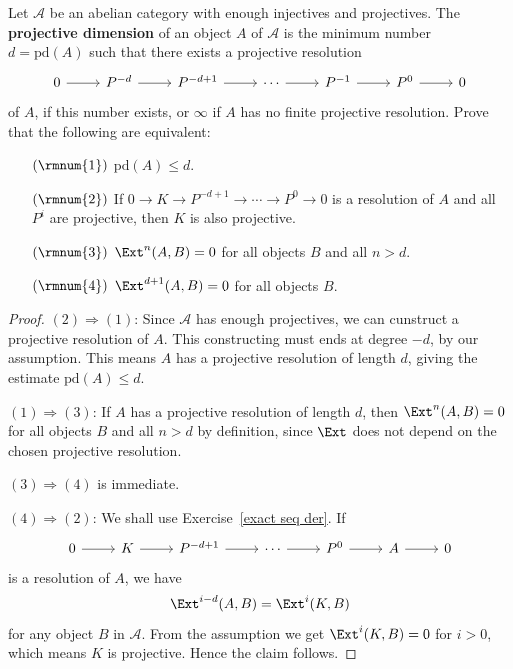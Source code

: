 \begin{exercise}
Let $\mathcal{A}$ be an abelian category with enough injectives and projectives. The \textbf{projective dimension} of an object $A$ of $\mathcal{A}$ is the minimum number $d=\mathrm{pd}(A)$ such that there exists a projective resolution
\[\begin{tikzcd}
0\ar[r]&P^{-d}\ar[r]&P^{-d+1}\ar[r]&\cdots\ar[r]&P^{-1}\ar[r]&P^0\ar[r]&0
\end{tikzcd}\]
of $A$, if this number exists, or $\infty$ if $A$ has no finite projective resolution. Prove that the following are equivalent:
\begin{itemize}
\item[$(\rmnum{1})$] $\mathrm{pd}(A)\leqslant d$.
\item[$(\rmnum{2})$] If $0\to K\to P^{-d+1}\to\cdots\to P^0\to 0$ is a resolution of $A$ and all $P^i$ are
projective, then $K$ is also projective.
\item[$(\rmnum{3})$] $\Ext^n(A,B)=0$ for all objects $B$ and all $n>d$.
\item[$(\rmnum{4})$] $\Ext^{d+1}(A,B)=0$ for all objects $B$.
\end{itemize}
\end{exercise}
\begin{proof}
$(2)\Rightarrow(1)$: Since $\mathcal{A}$ has enough projectives, we can cunstruct a projective resolution of $A$. This constructing must ends at degree $-d$, by our assumption. This means $A$ has a projective resolution of length $d$, giving the estimate $\mathrm{pd}(A)\leqslant d$.\par
$(1)\Rightarrow(3)$: If $A$ has a projective resolution of length $d$, then $\Ext^n(A,B)=0$ for all objects $B$ and all $n>d$ by definition, since $\Ext$ does not depend on the chosen projective resolution.\par
$(3)\Rightarrow(4)$ is immediate.\par
$(4)\Rightarrow(2)$: We shall use Exercise~\ref{exact seq der}. If
\[\begin{tikzcd}
0\ar[r]&K\ar[r]&P^{-d+1}\ar[r]&\cdots\ar[r]&P^0\ar[r]&A\ar[r]&0
\end{tikzcd}\]
is a resolution of $A$, we have
\[\Ext^{i-d}(A,B)=\Ext^i(K,B)\]
for any object $B$ in $\mathcal{A}$. From the assumption we get $\Ext^i(K,B)=0$ for $i>0$, which means $K$ is projective. Hence the claim follows.
\end{proof}
